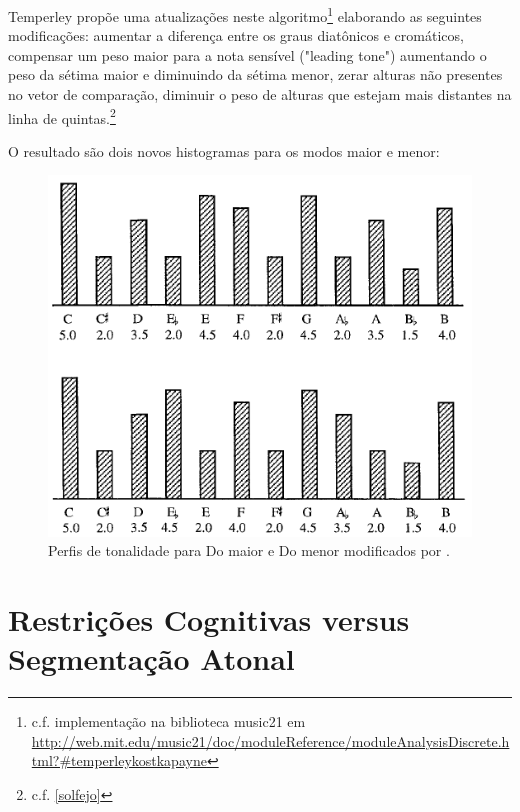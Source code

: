 \documentclass[
	12pt,				%
	openright,			%
	twoside,			%
	a4paper,			%
	english,			%
	french,				%
	spanish,			%
	brazil				%
	]{abntex2}
\begin{document}
Temperley propõe uma atualizações neste algoritmo\cite[pg.173-182]{temperley2001cognition}\footnote{c.f. implementação na biblioteca music21 em \url{http://web.mit.edu/music21/doc/moduleReference/moduleAnalysisDiscrete.html?\#temperleykostkapayne}} elaborando as seguintes modificações: aumentar a diferença entre os graus diatônicos e cromáticos, compensar um peso maior para a nota sensível ("leading tone") aumentando o peso da sétima maior e diminuindo da sétima menor\cite[p.182]{temperley2001cognition}, zerar alturas não presentes no vetor de comparação\cite[p.180]{temperley2001cognition}, diminuir o peso de alturas que estejam mais distantes na linha de quintas.\cite{temperley2001cognition}\footnote{c.f. \autoref{solfejo}}

O resultado são dois novos histogramas para os modos maior e menor:


\begin{figure}[!h]
	\caption{\label{fig_grafico}Perfis de tonalidade para Do maior e Do menor modificados por . }
	\begin{center}
	    \includegraphics[scale=0.6]{CBMS/temperley_mod_keyprofile.png}
	\end{center}
\end{figure}



\pagebreak
\section{Restrições Cognitivas versus Segmentação Atonal}
\end{document}
